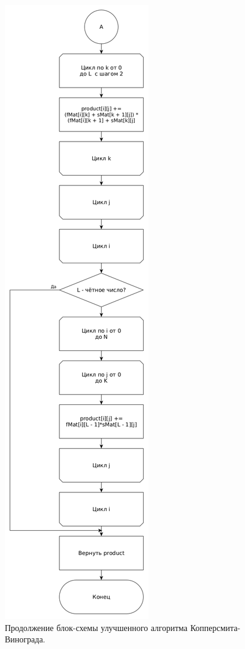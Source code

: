 \documentclass[12pt]{report}
\begin{document}
\begin{figure}
\begin{center}
\includegraphics[scale=0.29]{inc/img/WinogradUpdPart2.png}
\captionsetup{justification=centering}
	\caption{Продолжение блок-схемы улучшенного алгоритма Копперсмита-Винограда.}
	\label{img:WinogradUpd2}	
\end{center}
\end{figure}
\end{document}
